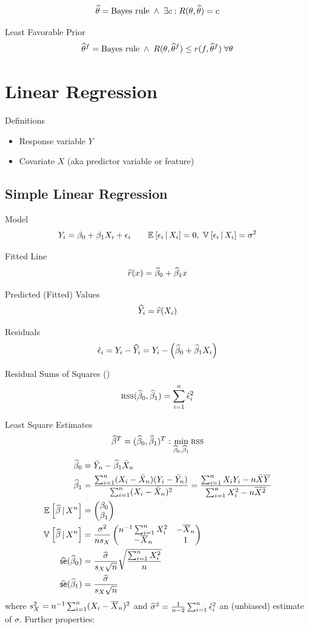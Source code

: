 \documentclass[landscape]{article}
\begin{document}
\begin{multicols*}{2}
$$\widehat{\theta} = \text{Bayes rule} \; \wedge \; 
\exists c: R(\theta,\widehat{\theta}) = c$$

Least Favorable Prior 
$$\widehat{\theta}^f = \text{Bayes rule} \; \wedge \; 
R(\theta,\widehat{\theta}^f) \le r(f,\widehat{\theta}^f) \;\forall\theta$$

\section{Linear Regression}

Definitions
\begin{itemize}
  \item Response variable $Y$
  \item Covariate $X$ (aka predictor variable or feature)
\end{itemize}

\subsection{Simple Linear Regression}
Model
$$Y_i = \beta_0 + \beta_1 X_i + \epsilon_i
\qquad \mathbb{E}_{}\left[\epsilon_i\,|\, X_i\right] = 0 ,\; \mathbb{V}_{}\left[\epsilon_i\,|\, X_i\right] = \sigma^2$$

Fitted Line
$$\widehat{r}(x) = \widehat{\beta}_0 + \widehat{\beta}_1 x$$

Predicted (Fitted) Values
$$\widehat{Y}_i = \widehat{r}(X_i)$$

Residuals
$$\hat{\epsilon}_i = Y_i - \widehat{Y}_i 
= Y_i - \left( \widehat{\beta}_0 + \widehat{\beta}_1 X_i \right)$$

Residual Sums of Squares (\rss)
$$\textsc{rss}(\widehat{\beta}_0,\widehat{\beta}_1) = \sum_{i=1}^n \hat{\epsilon}_i^2$$

Least Square Estimates
$$\widehat{\beta}^T=(\widehat{\beta}_0, \widehat{\beta}_1)^T: \min_{\widehat{\beta}_0,\widehat{\beta}_1}\textsc{rss}$$
\begin{align*}
  \widehat{\beta}_0 &= \bar Y_n - \widehat{\beta}_1 \bar X_n \\
  \widehat{\beta}_1 &= \frac{\sum_{i=1}^n(X_i-\bar X_n)(Y_i-\bar Y_n)}{\sum_{i=1}^n(X_i - \bar X_n)^2}
           = \frac{\sum_{i=1}^n X_iY_i-n\bar{X}\overline{Y}}{\sum_{i=1}^n X_i^2 - n\overline{X^2}} \\
  \mathbb{E}_{}\left[\widehat{\beta}\,|\, X^n\right] &= \begin{pmatrix}\beta_0 \\ \beta_1\end{pmatrix} \\
  \mathbb{V}_{}\left[\widehat{\beta}\,|\, X^n\right] &= 
  \frac{\sigma^2}{n s_X}
    \begin{pmatrix}n^{-1}\sum_{i=1}^n X_i^2 & -\overline{X}_n \\ -\overline{X}_n & 1\end{pmatrix} \\
  \widehat{\textsf{se}}(\widehat{\beta}_0) &= \frac{\widehat{\sigma}}{s_X\sqrt{n}} \sqrt{\frac{\sum_{i=1}^n X_i^2}{n}} \\
  \widehat{\textsf{se}}(\widehat{\beta}_1) &= \frac{\widehat{\sigma}}{s_X\sqrt{n}}
\end{align*}
where $s_X^2 = n^{-1} \sum_{i=1}^n(X_i-\overline{X}_n)^2$ and $\widehat{\sigma}^2 = \frac{1}{n-2} \sum_{i=1}^n
\hat{\epsilon}_i^2$ an (unbiased) estimate of $\sigma$. Further properties:


\end{multicols*}
\end{document}
